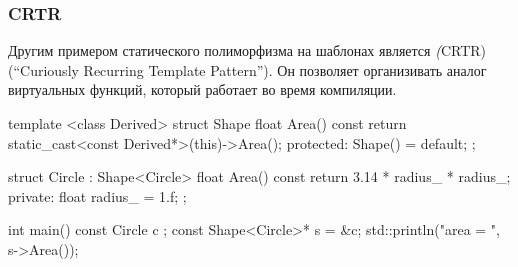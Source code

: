 \documentclass[compress, 8pt, aspectratio=169]{beamer}
\begin{document}
  \begin{frame}[fragile]

    \frametitle{CRTR}

    Другим примером статического полиморфизма на шаблонах\break
    является \textit(CRTR) (\enquote{Curiously Recurring Template Pattern}).
    Он позволяет организивать аналог виртуальных функций, который
    работает во время компиляции.

    \begin{myinplacelisting}[minted language=cpp]
template <class Derived>
struct Shape {
    float Area() const {
        return static_cast<const Derived*>(this)->Area();
    }
protected: Shape() = default;
};

struct Circle : Shape<Circle> {
    float Area() const { return 3.14 * radius_ * radius_; }
private: float radius_ = 1.f;
};

int main() {
    const Circle c {};
    const Shape<Circle>* s = &c;
    std::println("area = {}", s->Area());
}
    \end{myinplacelisting}
    
  \end{frame}
\end{document}

